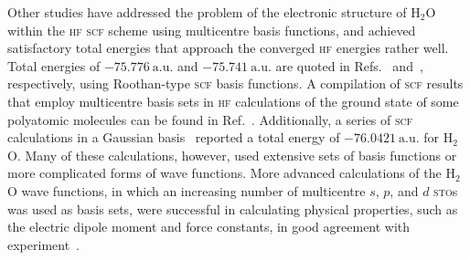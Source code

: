 Other studies have addressed the problem of the electronic structure
of H$_{2}$O within the \textsc{hf} \textsc{scf} scheme using
multicentre basis functions, and achieved satisfactory total energies
that approach the converged \textsc{hf} energies rather well. Total
energies of $-75.776\ \mathrm{a.u.}$ and $-75.741\ \mathrm{a.u.}$ are
quoted in Refs.~\cite{Reeves_nature_1956} and~\cite{natureH2O_1960},
respectively, using Roothan-type \textsc{scf} basis functions. A
compilation of \textsc{scf} results that employ multicentre basis sets
in \textsc{hf} calculations of the ground state of some polyatomic
molecules can be found in
Ref.~\cite{Moccia_oneCenterHF_1967}. Additionally, a series of
\textsc{scf} calculations in a Gaussian basis~\cite{gaussianH2O_1965}
reported a total energy of $-76.0421\ \mathrm{a.u.}$ for H$_{2}$O.
Many of these calculations, however, used extensive sets of basis
functions or more complicated forms of wave functions. More advanced
calculations of the H$_{2}$O wave functions, in which an increasing
number of multicentre $s$, $p$, and $d$ \textsc{sto}s was used as
basis sets, were successful in calculating physical properties, such
as the electric dipole moment and force constants, in good agreement
with experiment~\cite{Pitzer_1968,Pitzer_1970}.











